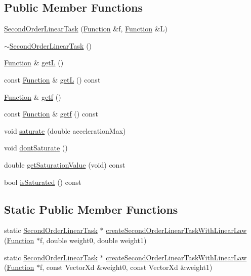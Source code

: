 \subsection*{Public Member Functions}
\begin{DoxyCompactItemize}
\item 
\hyperlink{classocra_1_1SecondOrderLinearTask_ac54c18fe5d5ba11cfc728361a8ab86eb}{Second\+Order\+Linear\+Task} (\hyperlink{classocra_1_1Function}{Function} \&f, \hyperlink{classocra_1_1Function}{Function} \&L)
\item 
\hyperlink{classocra_1_1SecondOrderLinearTask_a9d27ffc898ce40ba091c59fd3e4bea6e}{$\sim$\+Second\+Order\+Linear\+Task} ()
\item 
\hyperlink{classocra_1_1Function}{Function} \& \hyperlink{classocra_1_1SecondOrderLinearTask_a626defc13e1da5ae7b340b9e8591c840}{getL} ()
\item 
const \hyperlink{classocra_1_1Function}{Function} \& \hyperlink{classocra_1_1SecondOrderLinearTask_ac0b4bce5cc4bb7648c7585750c3bebbb}{getL} () const
\item 
\hyperlink{classocra_1_1Function}{Function} \& \hyperlink{classocra_1_1SecondOrderLinearTask_ac370b605ace05a35f3a5f68a49439c2d}{getf} ()
\item 
const \hyperlink{classocra_1_1Function}{Function} \& \hyperlink{classocra_1_1SecondOrderLinearTask_a3493f2c47a42df1be0de33a4b7f473ac}{getf} () const
\item 
void \hyperlink{classocra_1_1SecondOrderLinearTask_ad49dff8c7451d4753126328d3a47e4ba}{saturate} (double acceleration\+Max)
\item 
void \hyperlink{classocra_1_1SecondOrderLinearTask_a8e155a518199e0ae1b8eca4915d46420}{dont\+Saturate} ()
\item 
double \hyperlink{classocra_1_1SecondOrderLinearTask_ab36774d979e6930e5bb56bb9fe913667}{get\+Saturation\+Value} (void) const
\item 
bool \hyperlink{classocra_1_1SecondOrderLinearTask_a4f688efc6873334cfac467edd4fe4481}{is\+Saturated} () const
\end{DoxyCompactItemize}
\subsection*{Static Public Member Functions}
\begin{DoxyCompactItemize}
\item 
static \hyperlink{classocra_1_1SecondOrderLinearTask}{Second\+Order\+Linear\+Task} $\ast$ \hyperlink{classocra_1_1SecondOrderLinearTask_a9d9b45129ef6c513cf67bc55c33aae05}{create\+Second\+Order\+Linear\+Task\+With\+Linear\+Law} (\hyperlink{classocra_1_1Function}{Function} $\ast$f, double weight0, double weight1)
\item 
static \hyperlink{classocra_1_1SecondOrderLinearTask}{Second\+Order\+Linear\+Task} $\ast$ \hyperlink{classocra_1_1SecondOrderLinearTask_a3320983d1930ac8b049116b186d17dd1}{create\+Second\+Order\+Linear\+Task\+With\+Linear\+Law} (\hyperlink{classocra_1_1Function}{Function} $\ast$f, const Vector\+Xd \&weight0, const Vector\+Xd \&weight1)
\end{DoxyCompactItemize}
